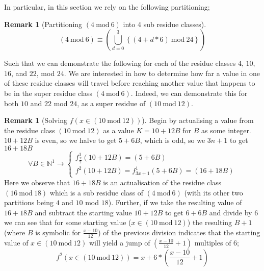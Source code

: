 \documentclass[12pt,a4paper]{amsart}
\numberwithin{equation}{section}
\theoremstyle{plain}
\theoremstyle{definition}
\newtheorem{Rem}[Th]{Remark}
\begin{document}
In particular, in this section we rely on the following partitioning; 

\begin{Rem}[Partitioning $\left ( 4\:\mathrm{mod}\:6 \right )$ into 4 sub residue classes]
\begin{equation}
\left ( 4\:\mathrm{mod}\:6 \right ) \equiv \left (\bigcup_{d=0}^{3} \left \{ \left (4+d*6  \right )\:\mathrm{mod}\:24 \right \}  \right )
\end{equation}
\end{Rem}

Such that we can demonstrate the following for each of the residue classes $4$, $10$, $16$, and $22$, mod $24$. We are interested in how to determine how far a value in one of these residue classes will travel before reaching another value that happens to be in the super residue class $\left ( 4\:\mathrm{mod}\:6 \right )$. Indeed, we can demonstrate this for both $10$ and $22$ mod $24$, as a super residue of $\left ( 10\:\mathrm{mod}\:12 \right )$.

\begin{Rem}[Solving $f \left ( x \in \left ( 10\:\mathrm{mod}\:12 \right ) \right )$]
Begin by actualising a value from the residue class $\left ( 10\:\mathrm{mod}\:12 \right )$ as a value $K = 10 + 12B$ for $B$ as some integer. $10 + 12B$ is even, so we halve to get $5 + 6B$, which is odd, so we $3n+1$ to get $16+18B$
\begin{equation}
\forall B \in \mathbb{N}^{1} \rightarrow \left \{  \begin{matrix}
f^{1}_{\frac{x}{2}} \left ( 10+12B \right ) = \left ( 5+6B \right ) \\ 
f^{2} \left ( 10+12B \right ) = f^{1}_{3x+1} \left ( 5+6B \right ) =  \left ( 16+18B \right )
\end{matrix} \right.
\end{equation}
Here we observe that $16+18B$ is an actualisation of the residue class  $\left ( 16\:\mathrm{mod}\:18 \right )$ which is a sub residue class of  $\left ( 4\:\mathrm{mod}\:6 \right )$ (with its other two partitions being $4$ and $10$ mod $18$). Further, if we take the resulting value of $16+18B$ and subtract the starting value $10+12B$ to get $6+6B$ and divide by $6$ we can see that for some starting value ($x \in \left ( 10\:\mathrm{mod}\:12 \right )$) the resulting $B+1$ (where $B$ is symbolic for $\frac{x-10}{12}$) of the previous division indicates that the starting value of $x \in \left ( 10\:\mathrm{mod}\:12 \right )$ will yield a jump of $\left ( \frac{x-10}{12} + 1 \right )$ multiples of $6$;
\begin{equation}
f^{2} \left ( x \in \left ( 10\:\mathrm{mod}\:12 \right ) \right ) = x+6*\left ( \frac{x-10}{12} + 1 \right )
\end{equation}
\end{Rem}
\end{document}
